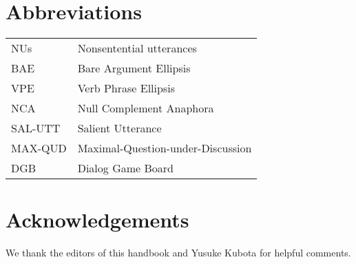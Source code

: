 \documentclass[output=paper
                ,modfonts
                ,nonflat
	        ,collection
	        ,collectionchapter
	        ,collectiontoclongg
 	        ,biblatex
                ,babelshorthands
                ,newtxmath
                ,draftmode
                ,colorlinks, citecolor=brown
]{./langsci/langscibook}
\begin{document}








\section*{Abbreviations}

\begin{tabularx}{.99\textwidth}{@{}lX}
NUs & Nonsentential utterances\\
BAE & Bare Argument Ellipsis\\
VPE & Verb Phrase Ellipsis\\
NCA & Null Complement Anaphora\\
SAL-UTT & Salient Utterance\\
MAX-QUD & Maximal-Question-under-Discussion\\
DGB & Dialog Game Board\\
\end{tabularx}


\section*{Acknowledgements}
We thank the editors of this handbook and Yusuke Kubota for helpful comments.

{\sloppy
\printbibliography[heading=subbibliography,notkeyword=this]
}
%
\end{document}
